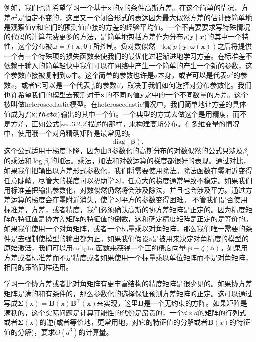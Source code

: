 例如，我们也许希望学习一个基于$\mathbf{x}$的$\mathbf{y}$的条件高斯方差。在这个简单的情况，方差$\sigma^2$是恒定不变的，这里又一个闭合形式的表达因为最大似然方差的估计器简单地是观察值$\mathbf{y}$和它们的预测值直接的方差的经验平均值。一个不需要要求写特殊情况的代码的计算花费更多的方法，是简单地包括方差作为分布$p(\mathbf{y}\mid\bm{x})$的其中一个特性，这个分布被$\bm{\omega}=f(\bm{x};\bm{\theta})$所控制。负对数似然$-\log p(\bm{y};\bm{\omega}(\bm{x}))$之后将提供一个有一个特殊项的损失函数来使我们的最优化过程渐进地学习方差。在标准差不依赖于输入的简单轻快中我们可以在网络中产生一个简单的产生一个新的参数，这个参数直接被复制到$\bm{\omega}$中。这个简单的参数也许是$\sigma$本身，或者可以是代表$\sigma^2$的参数$v$，或者它可以是一个代表$\frac{1}{\sigma^2}$的参数$\beta$，取决于我们如何选择对分布参数化。我们也许希望我们的模型去预测对于$\mathbf{x}$的不同的值$\mathbf{y}$之中的一个不同数量的方差。这个被叫做heteroscedastic模型。在heteroscedastic情况中，我们简单地让方差的具体值成为$f(\mathbf{x};\bm{theta})$输出的其中一个值。一个典型的方式去做这个是用精度，而不是方差，正如公式\ref{sec:3.2.2}描述的那样，来构建高斯分布。在多维变量的情况中，使用哦一个对角精确矩阵是最常见的。
\begin{equation}
\text{diag}(\bm{\beta}).
\end{equation}
这个公式适用于梯度下降，因为由$\bm{\beta}$参数化的高斯分布的对数似然的公式只涉及$\beta_i$的乘法和$\log \beta_i$的加法。乘法，加法和对数运算的梯度都很好的表现。通过对比，如果我们把输出以方差形式参数化，我们将需要使用除法。除法函数在零附近变得任意陡峭。尽管大的梯度可以帮助学习，任意大的梯度通常导致不稳定。如果我们用标准差把输出参数化，对数似然仍然将会涉及除法，并且也会涉及平方。通过方差运算的梯度会在零附近消失，使学习平方的参数变得困难。
不管我们是否使用标准差，方差，或者精度，我们必须确认高斯的协方差矩阵是正定的。因为精度矩阵的特征值是协方差矩阵的特征值的倒数，这和确定精度矩阵是正定的是等价的。如果我们使用一个对角矩阵，或者一个标量乘以对角矩阵，那么我们唯一需要的条件是去强制使模型的输出都为正。如果我们假设a是被用来决定对角精度的模型的原始激活，我们可以用softplus函数来获得一个正的精度向量:$\bm{\beta}=\zeta(\bm{a})$。如果用方差或者标准差而不是精度或者如果使用一个标量乘以单位矩阵而不是对角矩阵，相同的策略同样适用。

学习一个协方差或者比对角矩阵有更丰富结构的精度矩阵是很少见的。如果协方差矩阵是满的和有条件的，那么参数化的选择保证预测方差矩阵的正定。这可以通过写成$\bm{\Sigma}(\bm{x})=\bm{B}(\bm{x})\bm{B}^\top (\bm{x})$来实现，这里$\bm{B}$是一个无约束的方阵。如果矩阵是满秩的，这个实际问题是计算可能性的代价是昂贵的，一个$d\times d$的矩阵的行列式或者$\bm{\Sigma}(\bm{x})$的逆(或者等价地，更常用地，对它的特征值的分解或者$\bm{B}(x)$的特征值的分解)，要求$O(d^3)$的计算量。

